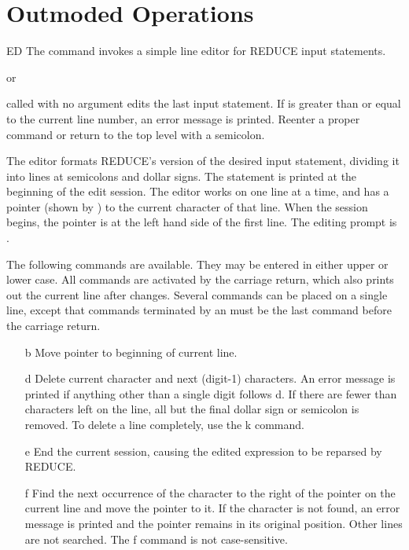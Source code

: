 \newpage
\section{Outmoded Operations}

\begin{Command}[ed]{ED}
The  command invokes a simple line editor for REDUCE input
statements.

\begin{Syntax}
  or 
\end{Syntax}

 called with no argument edits the last input statement.  If
 is greater than or equal to the current line number, an error
message is printed.  Reenter a proper  command or return to the
top level with a semicolon.

The editor formats REDUCE's version of the desired input statement,
dividing it into lines at semicolons and dollar signs.  The statement is 
printed at the beginning of the edit session.  The editor works on one
line at a time, and has a pointer (shown by \name{^}) to the current
character of that line.  When the session begins, the pointer is at the
left hand side of the first line.  The editing prompt is \name{>}.

The following commands are available.  They may be entered in either upper
or lower case.  All commands are activated by the carriage return, which
also prints out the current line after changes.  Several commands can be
placed on a single line, except that commands terminated by an 
must be the last command before the carriage return.

\begin{itemize}
\item[b]
Move pointer to beginning of current line.

\item[d\meta{digit}]
Delete current character and next (digit-1) characters.  An error message
is printed if anything other than a single digit follows d.  If there are
fewer than  characters left on the line, all but the final
dollar sign or semicolon is removed.  To delete a line completely, use the
k command.

\item[e]
End the current session, causing the edited expression to be reparsed by
REDUCE.

\item[f\meta{char}]
Find the next occurrence of the character  to the right of the
pointer on the current line and move the pointer to it. If the character is
not found, an error message is printed and the pointer remains in its
original position.  Other lines are not searched.  The f command is not
case-sensitive.


\end{itemize}
\end{Command}
